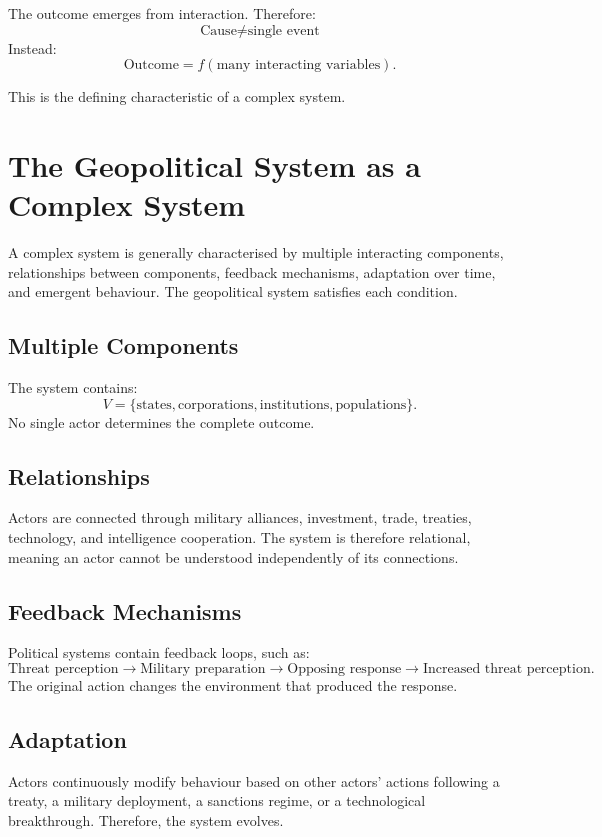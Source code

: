 \documentclass[11pt,openany]{book}
\theoremstyle{plain}
\theoremstyle{definition}
\begin{document}
The outcome emerges from interaction. Therefore:
\[
\boxed{
\text{Cause} \neq \text{single event}
}
\]
Instead:
\[
\boxed{
\text{Outcome} = f(\text{many interacting variables}).
}
\]

This is the defining characteristic of a complex system.

\section*{The Geopolitical System as a Complex System}

A complex system is generally characterised by multiple interacting components, relationships between components, feedback mechanisms, adaptation over time, and emergent behaviour. The geopolitical system satisfies each condition.

\subsection*{Multiple Components}

The system contains:
\[
V = \{ \text{states}, \text{corporations}, \text{institutions}, \text{populations} \}.
\]
No single actor determines the complete outcome.

\subsection*{Relationships}

Actors are connected through military alliances, investment, trade, treaties, technology, and intelligence cooperation. The system is therefore relational, meaning an actor cannot be understood independently of its connections.

\subsection*{Feedback Mechanisms}

Political systems contain feedback loops, such as:
\[
\text{Threat perception}
\longrightarrow
\text{Military preparation}
\longrightarrow
\text{Opposing response}
\longrightarrow
\text{Increased threat perception}.
\]
The original action changes the environment that produced the response.

\subsection*{Adaptation}

Actors continuously modify behaviour based on other actors' actions following a treaty, a military deployment, a sanctions regime, or a technological breakthrough. Therefore, the system evolves.
\end{document}
